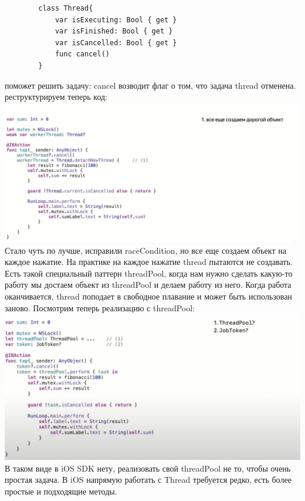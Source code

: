 \documentclass{article}
\begin{document}
    \begin{verbatim}
        class Thread{
            var isExecuting: Bool { get }
            var isFinished: Bool { get }
            var isCancelled: Bool { get }
            func cancel()
        }
    \end{verbatim}
     поможет решить задачу: cancel возводит флаг о том, что задача thread отменена. 
    \newline
    реструктурируем теперь код: 
    \newline
    \includegraphics[scale= 0.2]{pic/Снимок экрана 2023-08-04 в 12.54.34.png}
    \newline
    Стало чуть по лучше, исправили raceCondition, но все еще создаем объект на каждое нажатие. На практике на каждое нажатие thread пытаются не создавать. Есть такой специальный паттерн threadPool, когда нам нужно сделать какую-то работу мы достаем объект из threadPool и делаем работу из него. 
    \newline
    Когда работа оканчивается, thread поподает в свободное плавание и может быть использован заново. 
    \newline
    Посмотрим теперь реализацию с threadPool:
    \newline
    \includegraphics[scale = 0.5]{pic/Снимок экрана 2023-08-04 в 12.56.54.png}
    \newline
    В таком виде в iOS SDK нету, реализовать свой threadPool не то, чтобы очень простая задача. 
    \newline
    В iOS напрямую работать с Thread требуется редко, есть более простые и подходящие методы. 
\end{document}
